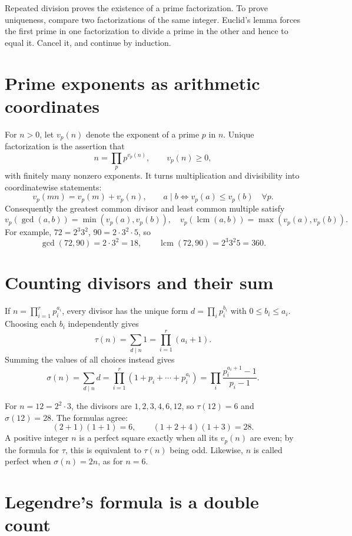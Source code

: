 Repeated division proves the existence of a prime factorization. To prove uniqueness, compare two factorizations of the same integer. Euclid's lemma forces the first prime in one factorization to divide a prime in the other and hence to equal it. Cancel it, and continue by induction.

\section{Prime exponents as arithmetic coordinates}

For \(n>0\), let \(v_p(n)\) denote the exponent of a prime \(p\) in \(n\). Unique factorization is the assertion that
\[
 n=\prod_p p^{v_p(n)},\qquad v_p(n)\ge0,
\]
with finitely many nonzero exponents. It turns multiplication and divisibility into coordinatewise statements:
\[
 v_p(mn)=v_p(m)+v_p(n),\qquad
 a\mid b\Longleftrightarrow v_p(a)\le v_p(b)\quad\forall p.
\]
Consequently the greatest common divisor and least common multiple satisfy
\[
 v_p(\gcd(a,b))=\min(v_p(a),v_p(b)),\quad
 v_p(\operatorname{lcm}(a,b))=\max(v_p(a),v_p(b)).
\]
For example, \(72=2^3 3^2\), \(90=2\cdot3^2\cdot5\), so
\[
 \gcd(72,90)=2\cdot 3^2=18,\qquad
 \operatorname{lcm}(72,90)=2^3 3^2 5=360.
\]

\section{Counting divisors and their sum}

If \(n=\prod_{i=1}^r p_i^{a_i}\), every divisor has the unique form \(d=\prod_i p_i^{b_i}\) with \(0\le b_i\le a_i\). Choosing each \(b_i\) independently gives
\[
 \tau(n)=\sum_{d\mid n}1=\prod_{i=1}^r(a_i+1).
\]
Summing the values of all choices instead gives
\[
 \sigma(n)=\sum_{d\mid n}d
 =\prod_{i=1}^r(1+p_i+\cdots+p_i^{a_i})
 =\prod_i\frac{p_i^{a_i+1}-1}{p_i-1}.
\]

For \(n=12=2^2\cdot3\), the divisors are \(1,2,3,4,6,12\), so \(\tau(12)=6\) and \(\sigma(12)=28\). The formulas agree:
\[
 (2+1)(1+1)=6,\qquad (1+2+4)(1+3)=28.
\]
A positive integer \(n\) is a perfect square exactly when all its \(v_p(n)\) are even; by the formula for \(\tau\), this is equivalent to \(\tau(n)\) being odd. Likewise, \(n\) is called perfect when \(\sigma(n)=2n\), as for \(n=6\).

\section{Legendre's formula is a double count}

